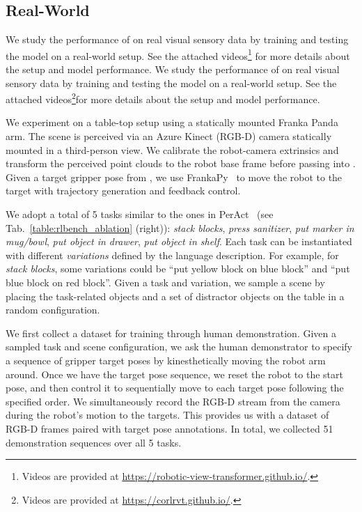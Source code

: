 \subsection{Real-World}
\label{sec:exp_real}
\ifarxiv
We study the performance of \method on real visual sensory data by training and testing the model on a real-world setup. See the attached videos\footnote{\label{footnote:video}Videos are provided at \href{https://robotic-view-transformer.github.io/}{https://robotic-view-transformer.github.io/}.}
for more details about the setup and model performance.
\else
We study the performance of \method on real visual sensory data by training and testing the model on a real-world setup. See the attached videos\footnote{\label{footnote:video}Videos are provided at \href{https://corlrvt.github.io/}{https://corlrvt.github.io/}.}for more details about the setup and model performance.
\fi

We experiment on a table-top setup using a statically mounted Franka Panda arm. The scene is perceived via an Azure Kinect (RGB-D) camera statically mounted in a third-person view. We calibrate the robot-camera extrinsics and transform the perceived point clouds to the robot base frame before passing into \method. Given a target gripper pose from \method, we use FrankaPy~\cite{zhang:arxiv2020} to move the robot to the target with trajectory generation and feedback control.

We adopt a total of 5 tasks similar to the ones in PerAct~\cite{peract2022arxiv} (see Tab.~\ref{table:rlbench_ablation} (right)): \textit{stack blocks}, \textit{press sanitizer}, \textit{put marker in mug/bowl}, \textit{put object in drawer}, \textit{put object in shelf}. Each task can be instantiated with different \textit{variations} defined by the language description. For example, for \textit{stack blocks}, some variations could be ``put yellow block on blue block'' and ``put blue block on red block''. Given a task and variation, we sample a scene by placing the task-related objects and a set of distractor objects on the table in a random configuration. 

We first collect a dataset for training \method through human demonstration. Given a sampled task and scene configuration, we ask the human demonstrator to specify a sequence of gripper target poses by kinesthetically moving the robot arm around. Once we have the target pose sequence, we reset the robot to the start pose, and then control it to sequentially move to each target pose following the specified order. We simultaneously record the RGB-D stream from the camera during the robot's motion to the targets. This provides us with a dataset of RGB-D frames paired with target pose annotations. In total, we collected 51 demonstration sequences over all 5 tasks.

